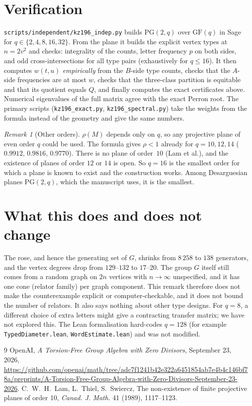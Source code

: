 \documentclass[11pt]{amsart}
\theoremstyle{remark}
\newtheorem{remark}[theorem]{Remark}
\begin{document}
\section{Verification}
\texttt{scripts/independent/kz196\_indep.py} builds $\mathrm{PG}(2,q)$ over
$\mathrm{GF}(q)$ in Sage for $q\in\{2,4,8,16,32\}$. From the plane it builds
the explicit vertex types at $n=2v^2$ and checks: integrality of the counts,
letter frequency $p$ on both sides, and odd cross-intersections for all type
pairs (exhaustively for $q\le16$). It then computes $w(t,u)$
\emph{empirically} from the $B$-side type counts, checks that the $A$-side
frequencies are at most $w$, checks that the three-class partition is
equitable and that its quotient equals $Q$, and finally computes the exact
certificates above. Numerical eigenvalues of the full matrix agree with the
exact Perron root. The primary scripts (\texttt{kz196\_exact.py},
\texttt{kz196\_spectral.py}) take the weights from the formula instead of the
geometry and give the same numbers.

\begin{remark}[Other orders]
$\rho(M)$ depends only on $q$, so any projective plane of even order $q$
could be used. The formula gives $\rho<1$ already for $q=10,12,14$
($0.9912$, $0.9816$, $0.9770$). There is no plane of order~$10$ (Lam et al.),
and the existence of planes of order $12$ or $14$ is open. So $q=16$ is the
smallest order for which a plane is known to exist and the construction works.
Among Desarguesian planes $\mathrm{PG}(2,q)$, which the manuscript uses, it
is the smallest.
\end{remark}

\section{What this does and does not change}
The rose, and hence the generating set of $G$, shrinks from $8\,258$ to
$138$ generators, and the vertex degrees drop from $129$--$132$ to $17$--$20$.
The group $G$ itself still comes from a random graph on $2n$ vertices with
$n\to\infty$ unspecified, and it has one cone (relator family) per graph
component. This remark therefore does not make the counterexample explicit or
computer-checkable, and it does not bound the number of relators. It also
says nothing about other type designs. For $q=8$, a different choice of extra
letters might give a contracting transfer matrix; we have not explored this.
The Lean formalisation hard-codes $q=128$ (for example
\texttt{TypedDiameter.lean}, \texttt{WordEstimate.lean}) and was not modified.

\begin{thebibliography}{9}
 OpenAI, \emph{A Torsion-Free Group Algebra with Zero Divisors},
September 23, 2026,
\url{https://github.com/openai/math/tree/adc7f1241b42e322a6451854ab7e4b4c146bf78a/preprints/A-Torsion-Free-Group-Algebra-with-Zero-Divisors-September-23-2026}.
 C.~W.~H.~Lam, L.~Thiel, S.~Swiercz, The non-existence of finite projective planes of order 10,
\emph{Canad. J. Math.} 41 (1989), 1117--1123.
\end{thebibliography}
\end{document}

